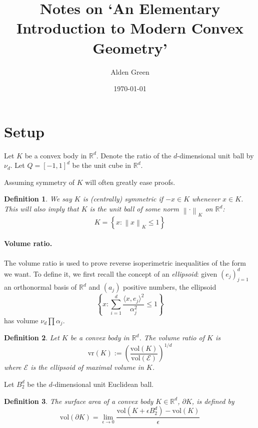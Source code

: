 \documentclass{article}
\newcommand{\Reals}{\mathbb{R}}
\newcommand{\norm}[1]{\left\lVert#1\right\rVert}
\newcommand{\dotp}[2]{\langle #1 , #2 \rangle}
\newcommand{\vol}{\mathrm{vol}}
\newcommand{\vr}{\mathrm{vr}}
\newcommand{\set}[1]{\left\{#1\right\}}
\newcommand{\Rd}{\Reals^d}
\newcommand{\E}{\mathcal{E}}
\theoremstyle{alden}
\newtheorem{definition}{Definition}[section]
\theoremstyle{aldenthm}
\theoremstyle{remark}
\begin{document}
	
\title{Notes on `An Elementary Introduction to Modern Convex Geometry'}
\author{Alden Green}
\date{\today}
\maketitle

\section{Setup}

Let $K$ be a convex body in $\Rd$. Denote the ratio of the $d$-dimensional unit ball by $\nu_d$. Let $Q = [-1,1]^d$ be the unit cube in $\Rd$. 

Assuming symmetry of $K$ will often greatly ease proofs.

\begin{definition}
	We say $K$ is \textit{(centrally) symmetric} if $-x \in K$ whenever $x \in K$. This will also imply that $K$ is the unit ball of some norm $\norm{\cdot}_K$ on $\Rd$:
	\begin{equation*}
	K = \set{x: \norm{x}_{K} \leq 1}
	\end{equation*}
\end{definition}

\paragraph{Volume ratio.}

The volume ratio is used to prove reverse isoperimetric inequalities of the form we want. To define it, we first recall the concept of an \textit{ellipsoid}: given $(e_j)_{j=1}^{d}$ an orthonormal basis of $\Rd$ and $(a_j)$ positive numbers, the ellipsoid
\begin{equation*}
\set{x: \sum_{i = 1}^{d} \frac{\dotp{x}{e_j}^2}{\alpha_j^2} \leq 1}
\end{equation*}
has volume $\nu_d \prod \alpha_j$.
\begin{definition}
	Let $K$ be a convex body in $\Rd$. The \textit{volume ratio} of $K$ is
	\begin{equation*}
	\vr(K) := \left(\frac{\vol(K)}{\vol(\E)}\right)^{1/d}
	\end{equation*}
	where $\E$ is the ellipsoid of maximal volume in $K$. 
\end{definition}

Let $B_2^d$ be the $d$-dimensional unit Euclidean ball.
\begin{definition}
	The \textit{surface area} of a convex body $K \in \Rd$, $\partial K$, is defined by
	\begin{equation*}
	\vol(\partial K) = \lim_{\epsilon \to 0} \frac{\vol(K + \epsilon B_2^d) - \vol(K)}{\epsilon}
	\end{equation*}
\end{definition}
\end{document}
